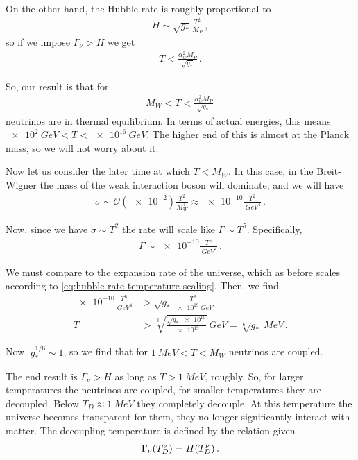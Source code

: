 \documentclass[main.tex]{subfiles}
\begin{document}
On the other hand, the Hubble rate is roughly proportional to 
%
\begin{align} \label{eq:hubble-rate-temperature-scaling}
H \sim \sqrt{g_{*}} \frac{T^2}{M_P}
\,,
\end{align}
%
so if we impose \(\Gamma_{\nu } > H\) we get  
%
\begin{align}
T < \frac{\alpha^2_{w} M_{P}}{\sqrt{g_{*}}}
\,.
\end{align}

So, our result is that for 
%
\begin{align}
M_W < T < \frac{\alpha^2_{w} M_P}{\sqrt{g_{*}}}
\,
\end{align}
%
neutrinos are in thermal equilibrium.
In terms of actual energies, this means \(\SI{e2}{GeV} < T < \SI{e16}{GeV}\). The higher end of this is almost at the Planck mass, so we will not worry about it.

Now let us consider the later time at which \(T < M_W\). In this case, in the Breit-Wigner the mass of the weak interaction boson will dominate, and we will have 
%
\begin{align}
\sigma \sim \mathcal{O}(\num{e-2}) \frac{T^2}{M_W^4} \approx \num{e-10} \frac{T^2}{\SI{}{GeV}^{4}}
\,.
\end{align}

Now, since we have \(\sigma \sim T^{2}\) the rate will scale like \(\Gamma \sim T^{5}\). Specifically, 
%
\begin{align}
\Gamma \sim \num{e-10} \frac{T^{5}}{\SI{}{GeV^{4}}}
\,.
\end{align}

We must compare to the expansion rate of the universe, which as before scales according to \ref{eq:hubble-rate-temperature-scaling}. Then, we find 
%
\begin{align}
\num{e-10} \frac{T^{5}}{\SI{}{GeV^{4}}} &> \sqrt{g_{*}} \frac{T^2}{\SI{e19}{GeV}}  \\
T &> \sqrt[3]{\frac{\sqrt{g_{*}} \num{e10}}{\num{e19}}} \SI{}{GeV} 
= \sqrt[6]{g_{*}} \SI{}{MeV}
\,.
\end{align}

Now, \(g_{*}^{1/6} \sim 1\), so we find that for \(\SI{1}{MeV} < T < M_W\) neutrinos are coupled. 

The end result is \(\Gamma_{\nu } > H\) as long as \(T > \SI{1}{MeV}\), roughly.
So, for larger temperatures the neutrinos are coupled, for smaller temperatures they are decoupled. Below \(T_D \approx\SI{1}{MeV}\) they completely decouple. 
At this temperature the universe becomes transparent for them, they no longer significantly interact with matter.
The decoupling temperature is defined by the relation given
%
\begin{align}
\Gamma_{\nu } \qty(T^{\nu }_{D}) = H(T^{\nu }_{D})
\,.
\end{align}
\end{document}
